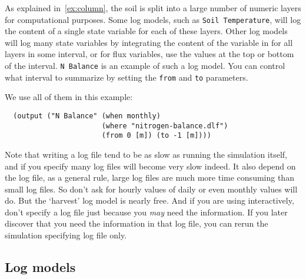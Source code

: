 \documentclass[a4paper,11pt]{article}
\begin{document}
As explained in~\ref{ex:column}, the soil is split into a large number
of numeric layers for computational purposes.  Some log models, such
as \texttt{Soil Temperature}, will log the content of a single state
variable for each of these layers.  Other log models will log many
state variables by integrating the content of the variable in for all
layers in some interval, or for flux variables, use the values at the
top or bottom of the interval.  \texttt{N Balance} is an example of
such a log model.  You can control what interval to summarize by
setting the \texttt{from} and \texttt{to} parameters.

We use all of them in this example:
\begin{verbatim}
  (output ("N Balance" (when monthly)
                       (where "nitrogen-balance.dlf")
                       (from 0 [m]) (to -1 [m])))
\end{verbatim}

Note that writing a log file tend to be as slow as running the
simulation itself, and if you specify many log files \daisy{} will
become very slow indeed.  It also depend on the log file, as a general
rule, large log files are much more time consuming than small log
files.  So don't ask for hourly values of daily or even monthly values
will do.  But the `harvest' log model is nearly free.  And if you are
using \daisy{} interactively, don't specify a log file just because
you \emph{may} need the information.  If you later discover that you
need the information in that log file, you can rerun the simulation
specifying log file only.

\subsection{Log models}
\label{sec:log-models}
\end{document}
